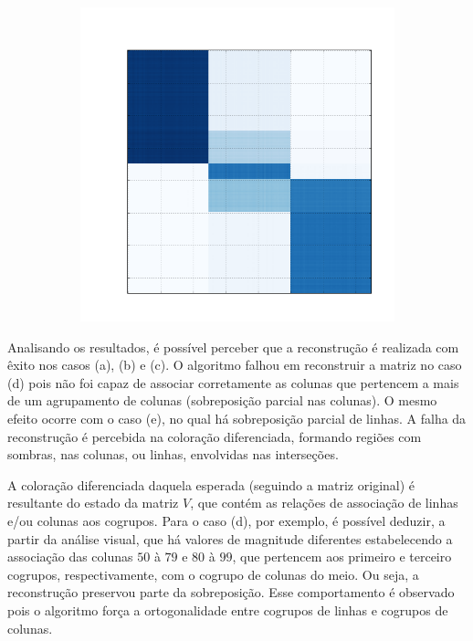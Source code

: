 \documentclass[
    12pt,                %
    oneside,            %
    a4paper,            %
    english,            %
    brazil                %
    ]{abntex2ppgsi}
\begin{document}
\begin{figure}[H]
\begin{subfigure}[b]{0.18\textwidth}
        \caption{}
    \end{subfigure}
    \begin{subfigure}[b]{0.18\textwidth}
        \includegraphics[width=\textwidth]{img/e-reconstruction-onmtf.png}
            \caption{}
    \end{subfigure}
\label{fig:reconstruction:onmtf}
\end{figure}


Analisando os resultados, é possível perceber que a reconstrução é realizada com êxito nos casos (a), (b) e (c).
O algoritmo falhou em reconstruir a matriz no caso (d) pois não foi capaz de associar corretamente as colunas que pertencem a mais de um agrupamento de colunas (sobreposição parcial nas colunas).
O mesmo efeito ocorre com o caso (e), no qual há sobreposição parcial de linhas.
A falha da reconstrução é percebida na coloração diferenciada, formando regiões com sombras, nas colunas, ou linhas, envolvidas nas interseções.

A coloração diferenciada daquela esperada (seguindo a matriz original) é resultante do estado da matriz $V$, que contém as relações de associação de linhas e/ou colunas aos cogrupos.
Para o caso (d), por exemplo, é possível deduzir, a partir da análise visual, que há valores de magnitude diferentes estabelecendo a associação das colunas $50$ à $79$ e $80$ à $99$, que pertencem aos primeiro e terceiro cogrupos, respectivamente, com o cogrupo de colunas do meio.
Ou seja, a reconstrução preservou parte da sobreposição.
Esse comportamento é observado pois o algoritmo força a ortogonalidade entre cogrupos de linhas e cogrupos de colunas.
\end{document}
